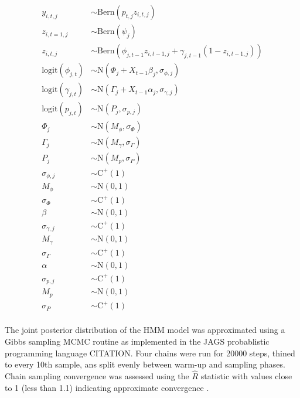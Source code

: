 \documentclass[12pt,letterpaper]{article}
\begin{document}
\begin{equation}
  \begin{aligned}
    y_{i, t, j} &\sim \mathrm{Bern}(p_{t, j} z_{i, t, j}) \\
    z_{i, t = 1, j} &\sim \mathrm{Bern}(\psi_{j}) \\
    z_{i, t, j} &\sim \mathrm{Bern}(\phi_{j, t - 1} z_{i, t - 1, j} + \gamma_{j, t - 1} (1 - z_{i, t - 1, j})) \\
    \mathrm{logit}(\phi_{j, t}) &\sim \mathrm{N}(\Phi_{j} + X_{t - 1}\beta_{j}, \sigma_{\phi, j}) \\
    \mathrm{logit}(\gamma_{j, t}) &\sim \mathrm{N}(\Gamma_{j} + X_{t - 1}\alpha_{j}, \sigma_{\gamma, j}) \\
    \mathrm{logit}(p_{j, t}) &\sim \mathrm{N}(P_{j}, \sigma_{p, j}) \\
    \Phi_{j} &\sim \mathrm{N}(M_{\phi}, \sigma_{\Phi}) \\
    \Gamma_{j} &\sim \mathrm{N}(M_{\gamma}, \sigma_{\Gamma}) \\
    P_{j} &\sim \mathrm{N}(M_{p}, \sigma_{P}) \\
    \sigma_{\phi, j} &\sim \mathrm{C}^{+}(1) \\
    M_{\phi} &\sim \mathrm{N}(0, 1) \\
    \sigma_{\Phi} &\sim \mathrm{C}^{+}(1) \\
    \beta &\sim \mathrm{N}(0, 1) \\
    \sigma_{\gamma, j} &\sim \mathrm{C}^{+}(1) \\
    M_{\gamma} &\sim \mathrm{N}(0, 1) \\
    \sigma_{\Gamma} &\sim \mathrm{C}^{+}(1) \\
    \alpha &\sim \mathrm{N}(0, 1) \\
    \sigma_{p, j} &\sim \mathrm{C}^{+}(1) \\
    M_{p} &\sim \mathrm{N}(0, 1) \\
    \sigma_{P} &\sim \mathrm{C}^{+}(1) \\
  \end{aligned}
\end{equation}


The joint posterior distribution of the HMM model was approximated using a Gibbs sampling MCMC routine as implemented in the JAGS probablistic programming language CITATION. Four chains were run for 20000 steps, thined to every 10th sample, ans split evenly between warm-up and sampling phases. Chain sampling convergence was assessed using the \(\hat{R}\) statistic with values close to 1 (less than 1.1) indicating approximate convergence \citep{Gelman2013d}.
\end{document}
